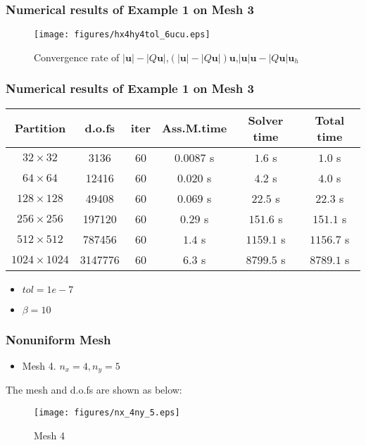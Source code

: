 \documentclass[notheorems,serif]{beamer}
\begin{document}
\begin{frame}
\frametitle{Numerical results of Example 1 on Mesh 3}
\begin{figure}[H] 
\centering 
\texttt{[image: figures/hx4hy4tol\_6ucu.eps]} 
\caption{Convergence rate of $\left|\boldsymbol{u}\right|-\left|Q\boldsymbol{u}\right|$,$(\left|\boldsymbol{u}\right|-\left|Q\boldsymbol{u}\right|)\boldsymbol{u}$,$\left|\boldsymbol{u}\right|\boldsymbol{u}-\left|Q\boldsymbol{u}\right|\boldsymbol{u}_h$}
\label{fig:normumesh3p1} 
\end{figure}
\end{frame}

\begin{frame}
\frametitle{Numerical results of Example 1 on Mesh 3}
\begin{tabular}{ |c|c|c|c|c|c| }   
\hline   
Partition & d.o.fs & iter & Ass.M.time & Solver time & Total time \\
\hline
$32\times 32$ & 3136 & 60 & $0.0087$ s & $1.6$ s & $1.0$ s \\
$64\times 64$ & 12416 & 60 & $0.020$ s & $4.2$ s & $4.0$ s \\
$128\times 128$ & 49408 & 60 & $0.069$ s & $22.5$ s & $22.3$ s \\
$256\times 256$ & 197120 & 60 & $0.29$ s & $151.6$ s & $151.1$ s \\
$512\times 512$ & 787456 & 60 & $1.4$ s & $1159.1$ s & $1156.7$ s \\
$1024\times 1024$ & 3147776 & 60 & $6.3$ s & $8799.5$ s & $8789.1$ s \\
\hline 
\end{tabular}
\smallskip
\begin{itemize}
\item $tol = 1e-7$
\item $\beta = 10$
\end{itemize}
\end{frame}



\begin{frame}
\frametitle{Nonuniform Mesh}
\begin{itemize}
\item Mesh 4. $n_x = 4, n_y = 5$
\end{itemize}
The mesh and d.o.fs are shown as below:
\begin{figure}[H] 
\centering 
\texttt{[image: figures/nx\_4ny\_5.eps]} 
\caption{Mesh 4} 
\label{fig:mesh4} 
\end{figure}
\end{frame}
\end{document}
